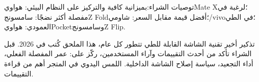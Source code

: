 توصيات الشراء:بميزانية كافية والتركيز على النظام البيئي: هواويMate X؛لرغبة في مفصلة أكثر نضجًا: سامسونجZ Fold؛أفضل قيمة مقابل السعر: شاومي/vivo؛في الطي العمودي: هواويPocketوسامسونجZ Flip.

\begin{tcbinfo}{تذكير أخير}
تقنية الشاشة القابلة للطي تتطور كل عام، هذا الملحق كُتب في 2026. قبل الشراء تأكد من أحدث التقييمات وآراء المستخدمين، ركّز على: عمر المفصلة الفعلي، أداء التجعيد، سياسة إصلاح الشاشة الداخلية. اللمس اليدوي في المتجر أهم من قراءة التقييمات.

\end{tcbinfo}
